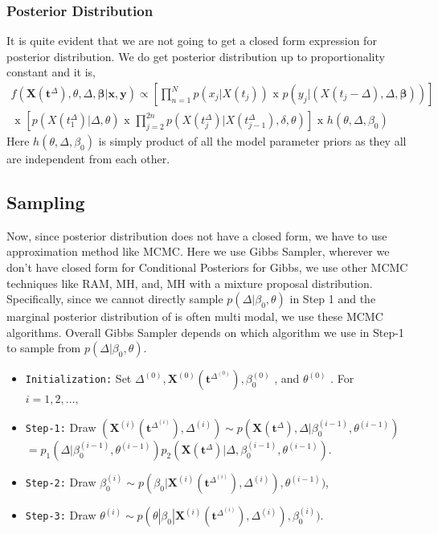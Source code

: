\documentclass{article}
\begin{document}
\subsubsection*{Posterior Distribution}
It is quite evident that we are not going to get a closed form expression for posterior distribution. We do get posterior distribution up to proportionality constant and it is,
\begin{multline*}
    f(\mathbf{X}(\boldsymbol{t}^{\Delta}),\theta,\Delta,\boldsymbol{\beta}|\boldsymbol{x},\boldsymbol{y}) \propto \left[\prod_{n=1}^N p(x_j|X(t_j)) \text{ x } p(y_j|(X(t_j-\Delta),\Delta,\boldsymbol{\beta}))\right] \\ \text{ x } \left[p(X(t_1^{\Delta})|\Delta,\theta) \text{ x } \prod_{j=2}^{2n} p(X(t_j^{\Delta})|X(t_{j-1}^{\Delta}),\delta,\theta)\right] \text{ x } h(\theta,\Delta,\beta_0)
\end{multline*}
Here $h(\theta,\Delta,\beta_0)$ is simply product of all the model parameter priors as they all are independent from each other.
\subsection*{Sampling}
Now, since posterior distribution does not have a closed form, we have to use approximation method like MCMC. Here we use Gibbs Sampler, wherever we don't have closed form for Conditional Posteriors for Gibbs, we use other MCMC techniques like RAM, MH, and, MH with a mixture proposal distribution. Specifically, since we cannot
directly sample $p( \Delta| \beta_0 , \theta )$ in Step 1 and the marginal posterior distribution of is often multi modal, we use these MCMC algorithms. Overall Gibbs Sampler depends on which algorithm we use in Step-1 to sample from $p( \Delta| \beta_0 , \theta )$.
\begin{tcolorbox}[colback=blue!5!white,colframe=blue,title=A Metropolis-Hastings within Gibbs Sampler]
\begin{itemize}
    \item \texttt{Initialization:} Set $\Delta^{(0)} , \mathbf{X}^{(0)} (\boldsymbol{t}^{\Delta^{(0)}}
 ), \beta_0^{(0)}$ , and $\theta^{(0)}$ . For $i = 1, 2, \ldots ,$
    \item \texttt{Step-1:} Draw $(\mathbf{X}^{(i)} (\boldsymbol{t}^{\Delta^{(i)}}
 ),\Delta^{(i)}) \sim p(\mathbf{X} (\boldsymbol{t}^{\Delta}
 ),\Delta|\beta_0^{(i-1)},\theta^{(i-1)})$\\$=p_1(\Delta|\beta_0^{(i-1)},\theta^{(i-1)})p_2(\mathbf{X} (\boldsymbol{t}^{\Delta}
 )|\Delta,\beta_0^{(i-1)},\theta^{(i-1)})$.
    \item \texttt{Step-2:} Draw $\beta_0^{(i)} \sim p(\beta_0|\mathbf{X}^{(i)} (\boldsymbol{t}^{\Delta^{(i)}}
 ),\Delta^{(i)}),\theta^{(i-1)})$,
 \item \texttt{Step-3:} Draw $\theta^{(i)} \sim p(\theta|\beta_0|\mathbf{X}^{(i)} (\boldsymbol{t}^{\Delta^{(i)}}
 ),\Delta^{(i)}),\beta_0^{(i)})$.
\end{itemize}
\end{tcolorbox}
\end{document}

